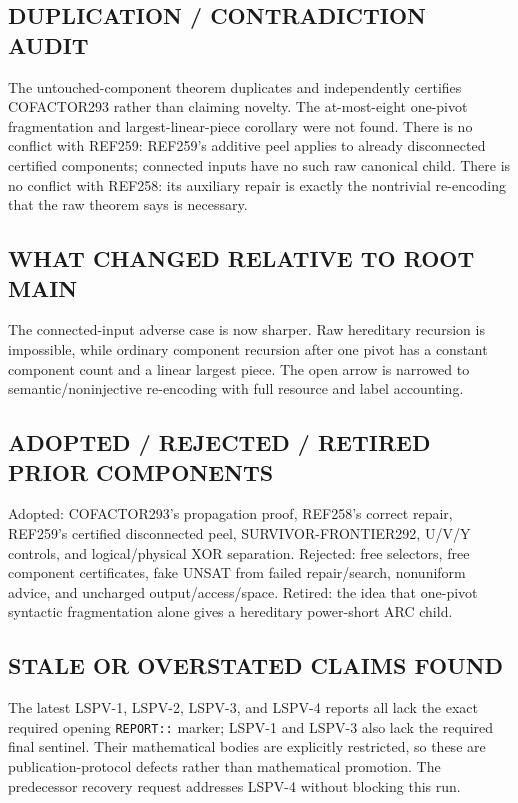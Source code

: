 \documentclass[11pt]{article}
\begin{document}
\subsection*{DUPLICATION / CONTRADICTION AUDIT}
The untouched-component theorem duplicates and independently certifies COFACTOR293 rather than claiming novelty.  The at-most-eight one-pivot fragmentation and largest-linear-piece corollary were not found.  There is no conflict with REF259: REF259's additive peel applies to already disconnected certified components; connected inputs have no such raw canonical child.  There is no conflict with REF258: its auxiliary repair is exactly the nontrivial re-encoding that the raw theorem says is necessary.

\subsection*{WHAT CHANGED RELATIVE TO ROOT MAIN}
The connected-input adverse case is now sharper.  Raw hereditary recursion is impossible, while ordinary component recursion after one pivot has a constant component count and a linear largest piece.  The open arrow is narrowed to semantic/noninjective re-encoding with full resource and label accounting.

\subsection*{ADOPTED / REJECTED / RETIRED PRIOR COMPONENTS}
Adopted: COFACTOR293's propagation proof, REF258's correct repair, REF259's certified disconnected peel, SURVIVOR-FRONTIER292, U/V/Y controls, and logical/physical XOR separation.  Rejected: free selectors, free component certificates, fake UNSAT from failed repair/search, nonuniform advice, and uncharged output/access/space.  Retired: the idea that one-pivot syntactic fragmentation alone gives a hereditary power-short ARC child.

\subsection*{STALE OR OVERSTATED CLAIMS FOUND}
The latest LSPV-1, LSPV-2, LSPV-3, and LSPV-4 reports all lack the exact required opening \texttt{REPORT::} marker; LSPV-1 and LSPV-3 also lack the required final sentinel.  Their mathematical bodies are explicitly restricted, so these are publication-protocol defects rather than mathematical promotion.  The predecessor recovery request addresses LSPV-4 without blocking this run.
\end{document}
